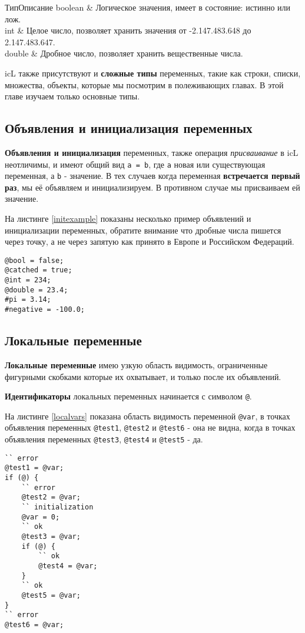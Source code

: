 \documentclass[a4paper, 14pt, russian]{extarticle}
\begin{document}
%
	{Тип}{Описание}%
	{ 
	boolean & Логическое значения, имеет в состояние: истинно или лож. \\ \hline
	int & Целое число, позволяет хранить значения от -2.147.483.648 до 2.147.483.647. \\ \hline
	double & Дробное число, позволяет хранить вещественные числа. \\
	}
	
	icL также присутствуют и \textbf{сложные типы} переменных, такие как строки, списки, множества, объекты, которые мы посмотрим в полеживающих главах. В этой главе изучаем только основные типы.
	
\subsection{Объявления и инициализация переменных}
	
	\textbf{Объявления и инициализация} переменных, также операция \textit{присваивание} в icL неотличимы, и имеют общий вид \lstinline`a = b`, где \lstinline`a` новая или существующая переменная, а \lstinline`b` - значение. В тех случаев когда переменная \textbf{встречается первый раз}, мы её объявляем и инициализируем. В противном случае мы присваиваем ей значение.
	
	На листинге \ref{initexample} показаны несколько пример объявлений и инициализации переменных, обратите внимание что дробные числа пишется через точку, а не через запятую как принято в Европе и Российском Федераций.
  	
\begin{lstlisting}[caption=Пример объявлений и инициализации символов,label=initexample]
@bool = false;
@catched = true;
@int = 234;
@double = 23.4;
#pi = 3.14;
#negative = -100.0;
\end{lstlisting}

\subsection{Локальные переменные}
	
	\textbf{Локальные переменные} имею узкую область видимость, ограниченные фигурными скобками которые их охватывает, и только после их объявлений. 
	
	{\bf Идентификаторы} локальных переменных начинается с символом \lstinline`@`. 
	
	На листинге \ref{localvars} показана область видимость переменной \lstinline`@var`, в точках объявления переменных \lstinline`@test1`, \lstinline`@test2` и \lstinline`@test6` - она не видна, когда в точках объявления переменных \lstinline`@test3`, \lstinline`@test4` и \lstinline`@test5` - да.
\begin{lstlisting}[caption=Область видимости локальных перемен, label=localvars]
`` error
@test1 = @var;
if (@) {
	`` error
	@test2 = @var; 
	`` initialization
	@var = 0;
	`` ok
	@test3 = @var;
	if (@) {
		`` ok
		@test4 = @var;
	}
	`` ok
	@test5 = @var; 
}
`` error
@test6 = @var; 
\end{lstlisting}
\end{document}
